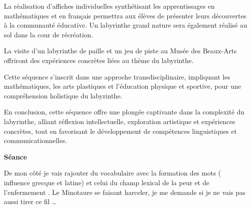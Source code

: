 La réalisation d'affiches individuelles synthétisant les apprentissages en mathématiques et en français permettra aux élèves de présenter leurs découvertes à la communauté éducative. Un labyrinthe grand nature sera également réalisé au sol dans la cour de récréation.

La visite d'un labyrinthe de paille et un jeu de piste au Musée des Beaux-Arts offriront des expériences concrètes liées au thème du labyrinthe.

Cette séquence s'inscrit dans une approche transdisciplinaire, impliquant les mathématiques, les arts plastiques et l'éducation physique et sportive, pour une compréhension holistique du labyrinthe.

En conclusion, cette séquence offre une plongée captivante dans la complexité du labyrinthe, alliant réflexion intellectuelle, exploration artistique et expériences concrètes, tout en favorisant le développement de compétences linguistiques et communicationnelles.

\textbf{Séance}

De mon côté je vais rajouter du vocabulaire avec la formation des mots ( influence grecque et latine) et celui du champ lexical de la peur et de l’enfermement . Le Minotaure se faisant harceler, je me demande si je ne vais pas aussi tirer ce fil … 